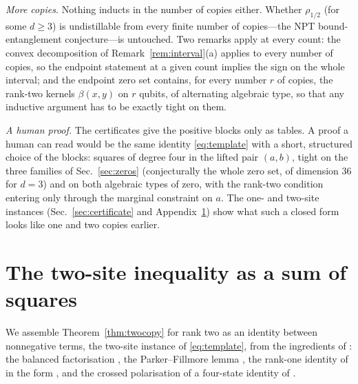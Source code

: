 \documentclass[aps,pra,twocolumn,superscriptaddress,nofootinbib,longbibliography]{revtex4-2}
\theoremstyle{plain}
\renewcommand{\thetheorem}{\arabic{section}.\arabic{theorem}}
\theoremstyle{definition}
\theoremstyle{remark}
\begin{document}
\emph{More copies.} Nothing inducts in the number of copies either. Whether $\rho_{1/2}$ (for some $d\ge3$) is undistillable from every finite number of copies---the NPT bound-entanglement conjecture---is untouched. Two remarks apply at every count: the convex decomposition of Remark~\ref{rem:interval}(a) applies to every number of copies, so the endpoint statement at a given count implies the sign on the whole interval; and the endpoint zero set contains, for every number $r$ of copies, the rank-two kernels $\beta(x,y)$ on $r$ qubits, of alternating algebraic type, so that any inductive argument has to be exactly tight on them.

\emph{A human proof.} The certificates give the positive blocks only as tables. A proof a human can read would be the same identity \eqref{eq:template} with a short, structured choice of the blocks: squares of degree four in the lifted pair $(a,b)$, tight on the three families of Sec.~\ref{sec:zeros} (conjecturally the whole zero set, of dimension $36$ for $d=3$) and on both algebraic types of zero, with the rank-two condition entering only through the marginal constraint on $a$. The one- and two-site instances (Sec.~\ref{sec:certificate} and Appendix~\ref{app:cut}) show what such a closed form looks like one and two copies earlier.

\appendix
\renewcommand{\thetheorem}{\Alph{section}.\arabic{theorem}}
\section{The two-site inequality as a sum of squares}\label{app:cut}

We assemble Theorem~\ref{thm:twocopy} for rank two as an identity between nonnegative terms, the two-site instance of \eqref{eq:template}, from the ingredients of \cite[\S\S6--8]{FHPV}: the balanced factorisation \cite[Lemma~7.1]{FHPV}, the Parker--Fillmore lemma \cite[Lemma~6.1]{FHPV}, the rank-one identity of \cite[Prop.~1]{CostaRico} in the form \cite[Lemma~6.4]{FHPV}, and the crossed polarisation \cite[Cor.~6.7]{FHPV} of a four-state identity of \cite{ES}.
\end{document}
